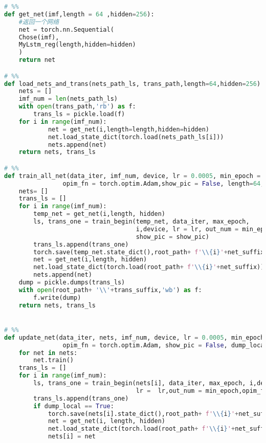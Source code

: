 \begin{appendices}
\begin{lstlisting}[language=python]
# %%
def get_net(imf,length = 64 ,hidden=256):
    #返回一个网络
    net = torch.nn.Sequential(
    Chose(imf),
    MyLstm_reg(length,hidden=hidden)
    )
    return net

# %%
def load_nets_and_trans(nets_path_ls, trans_path,length=64,hidden=256):
    nets = []
    imf_num = len(nets_path_ls)
    with open(trans_path,'rb') as f:
        trans_ls = pickle.load(f)
    for i in range(imf_num):
            net = get_net(i,length=length,hidden=hidden)
            net.load_state_dict(torch.load(nets_path_ls[i]))
            nets.append(net)
    return nets, trans_ls

# %%
def train_all_net(data_iter, imf_num, device, lr = 0.0005, min_epoch = 800, max_epoch = 10000, root_path='net',net_suffix='_lstm.pkl',trans_suffix= 'trans_ls.info',
                opim_fn = torch.optim.Adam,show_pic = False, length=64, hidden=256):
    nets= []
    trans_ls = []
    for i in range(imf_num):
        temp_net = get_net(i,length, hidden)
        ls, trans_one = train_begin(temp_net, data_iter, max_epoch,
                                    i,device, lr = lr, out_num = min_epoch,opim_fn=opim_fn,
                                    show_pic = show_pic)
        trans_ls.append(trans_one)
        torch.save(temp_net.state_dict(),root_path+ f'\\{i}'+net_suffix)
        net = get_net(i,length, hidden)
        net.load_state_dict(torch.load(root_path+ f'\\{i}'+net_suffix))
        nets.append(net)
    dump = pickle.dumps(trans_ls)
    with open(root_path+ '\\'+trans_suffix,'wb') as f:
        f.write(dump)
    return nets, trans_ls


# %%
def update_net(data_iter, nets, imf_num, device, lr = 0.0005, min_epoch = 800, max_epoch = 10000, root_path='net',net_suffix='_lstm.pkl',trans_suffix= 'trans_ls.info',
                opim_fn = torch.optim.Adam, show_pic = False, dump_local = False, length=64, hidden=256):
    for net in nets:
        net.train()
    trans_ls = []
    for i in range(imf_num):
        ls, trans_one = train_begin(nets[i], data_iter, max_epoch, i,device,
                                    lr =  lr,out_num = min_epoch,opim_fn=opim_fn, show_pic= show_pic)
        trans_ls.append(trans_one)
        if dump_local == True:
            torch.save(nets[i].state_dict(),root_path+ f'\\{i}'+net_suffix)
            net = get_net(i, length, hidden)
            net.load_state_dict(torch.load(root_path+ f'\\{i}'+net_suffix))
            nets[i] = net


\end{lstlisting}
\end{appendices}
